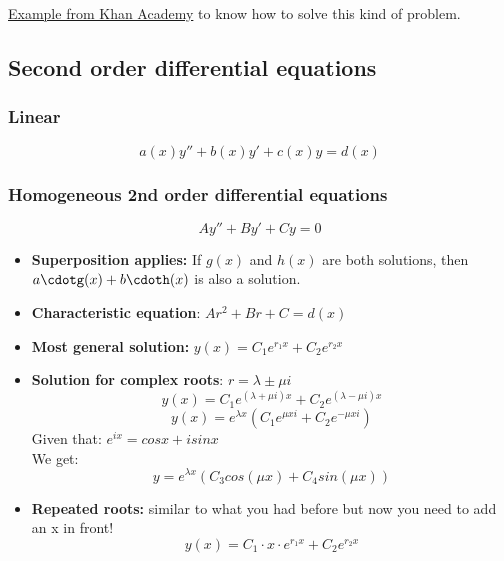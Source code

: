 \href{https://www.khanacademy.org/math/differential-equations/first-order-differential-equations/modal/v/exact-equations-example-2}{Example from Khan Academy} to know how to solve this kind of problem.

\subsection{Second order differential equations}
\subsubsection{Linear}
$$a(x)y''+b(x)y'+c(x)y=d(x)$$

\subsubsection{Homogeneous 2nd order differential equations}
$$Ay''+By'+Cy=0$$
\begin{itemize}
    \item \textbf{Superposition applies:} If $g(x)$ and $h(x)$ are both solutions, then $a\cdotg(x)+b\cdoth(x)$ is also a solution.
    \item \textbf{Characteristic equation}: $Ar^2+Br+C=d(x)$
    \item \textbf{Most general solution:} $y(x)=C_1e^{r_1x}+C_2e^{r_2x}$
    \item \textbf{Solution for complex roots}: $r=\lambda \pm \mu i$
    $$y(x)=C_1e^{(\lambda + \mu i)x}+C_2e^{(\lambda - \mu i)x}$$
$$y(x)= e^{\lambda x}(C_1e^{\mu xi}+C_2e^{-\mu xi})$$
Given that: $e^{ix}=cosx+isinx$\\
We get:
$$y=e^{\lambda x}(C_3cos(\mu x)+C_4sin(\mu x))$$
    \item \textbf{Repeated roots:} similar to what you had before but now you need to add an x in front!
$$y(x)=C_1\cdot x \cdot e^{r_1x}+C_2e^{r_2x}$$
\end{itemize}

